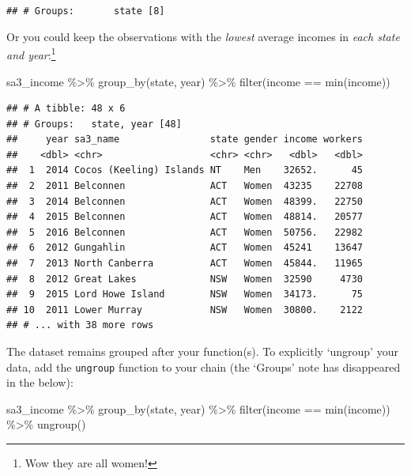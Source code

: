 \documentclass[
]{book}
\newenvironment{Shaded}{\begin{snugshade}}{\end{snugshade}}
\newcommand{\FunctionTok}[1]{\textcolor[rgb]{0.00,0.00,0.00}{#1}}
\newcommand{\NormalTok}[1]{#1}
\newcommand{\SpecialCharTok}[1]{\textcolor[rgb]{0.00,0.00,0.00}{#1}}
\begin{document}
\texttt{\#\#\ \#\ Groups:\ \ \ \ \ \ \ state\ {[}8{]}}

Or you could keep the observations with the \emph{lowest} average incomes in \emph{each state and year}:\footnote{Wow they are all women!}

\begin{Shaded}
\begin{Highlighting}[]
\NormalTok{sa3\_income }\SpecialCharTok{\%\textgreater{}\%} 
  \FunctionTok{group\_by}\NormalTok{(state, year) }\SpecialCharTok{\%\textgreater{}\%} 
  \FunctionTok{filter}\NormalTok{(income }\SpecialCharTok{==} \FunctionTok{min}\NormalTok{(income))}
\end{Highlighting}
\end{Shaded}

\begin{verbatim}
## # A tibble: 48 x 6
## # Groups:   state, year [48]
##     year sa3_name                state gender income workers
##    <dbl> <chr>                   <chr> <chr>   <dbl>   <dbl>
##  1  2014 Cocos (Keeling) Islands NT    Men    32652.      45
##  2  2011 Belconnen               ACT   Women  43235    22708
##  3  2014 Belconnen               ACT   Women  48399.   22750
##  4  2015 Belconnen               ACT   Women  48814.   20577
##  5  2016 Belconnen               ACT   Women  50756.   22982
##  6  2012 Gungahlin               ACT   Women  45241    13647
##  7  2013 North Canberra          ACT   Women  45844.   11965
##  8  2012 Great Lakes             NSW   Women  32590     4730
##  9  2015 Lord Howe Island        NSW   Women  34173.      75
## 10  2011 Lower Murray            NSW   Women  30800.    2122
## # ... with 38 more rows
\end{verbatim}

The dataset remains grouped after your function(s). To explicitly `ungroup' your data, add the \texttt{ungroup} function to your chain (the `Groups' note has disappeared in the below):

\begin{Shaded}
\begin{Highlighting}[]
\NormalTok{sa3\_income }\SpecialCharTok{\%\textgreater{}\%} 
  \FunctionTok{group\_by}\NormalTok{(state, year) }\SpecialCharTok{\%\textgreater{}\%} 
  \FunctionTok{filter}\NormalTok{(income }\SpecialCharTok{==} \FunctionTok{min}\NormalTok{(income)) }\SpecialCharTok{\%\textgreater{}\%} 
  \FunctionTok{ungroup}\NormalTok{()}
\end{Highlighting}
\end{Shaded}
\end{document}
